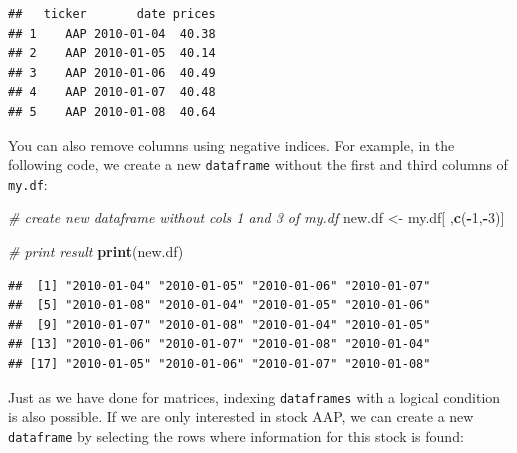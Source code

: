 \documentclass[11pt,]{book}
\newenvironment{Shaded}{\begin{snugshade}}{\end{snugshade}}
\newcommand{\KeywordTok}[1]{\textcolor[rgb]{0.27,0.27,0.27}{\textbf{#1}}}
\newcommand{\DecValTok}[1]{\textcolor[rgb]{0.06,0.06,0.06}{#1}}
\newcommand{\StringTok}[1]{\textcolor[rgb]{0.5,0.5,0.5}{#1}}
\newcommand{\CommentTok}[1]{\textcolor[rgb]{0.56,0.35,0.01}{\textit{#1}}}
\newcommand{\OtherTok}[1]{\textcolor[rgb]{0.56,0.35,0.01}{#1}}
\newcommand{\OperatorTok}[1]{\textcolor[rgb]{0.81,0.36,0.00}{\textbf{#1}}}
\newcommand{\NormalTok}[1]{#1}
\begin{document}
\begin{Shaded}
\end{Shaded}

\begin{verbatim}
##   ticker       date prices
## 1    AAP 2010-01-04  40.38
## 2    AAP 2010-01-05  40.14
## 3    AAP 2010-01-06  40.49
## 4    AAP 2010-01-07  40.48
## 5    AAP 2010-01-08  40.64
\end{verbatim}

You can also remove columns using negative indices. For example, in the
following code, we create a new \texttt{dataframe} without the first and
third columns of \texttt{my.df}:

\begin{Shaded}
\begin{Highlighting}[]
\CommentTok{# create new dataframe without cols 1 and 3 of my.df}
\NormalTok{new.df <-}\StringTok{ }\NormalTok{my.df[ ,}\KeywordTok{c}\NormalTok{(}\OperatorTok{-}\DecValTok{1}\NormalTok{,}\OperatorTok{-}\DecValTok{3}\NormalTok{)]}

\CommentTok{# print result}
\KeywordTok{print}\NormalTok{(new.df)}
\end{Highlighting}
\end{Shaded}

\begin{verbatim}
##  [1] "2010-01-04" "2010-01-05" "2010-01-06" "2010-01-07"
##  [5] "2010-01-08" "2010-01-04" "2010-01-05" "2010-01-06"
##  [9] "2010-01-07" "2010-01-08" "2010-01-04" "2010-01-05"
## [13] "2010-01-06" "2010-01-07" "2010-01-08" "2010-01-04"
## [17] "2010-01-05" "2010-01-06" "2010-01-07" "2010-01-08"
\end{verbatim}

Just as we have done for matrices, indexing \texttt{dataframes} with a
logical condition is also possible. If we are only interested in stock
AAP, we can create a new \texttt{dataframe} by selecting the rows where
information for this stock is found:
\end{document}
